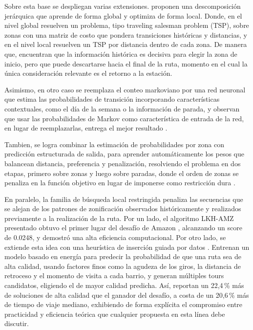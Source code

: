 Sobre esta base se despliegan varias extensiones.  proponen una descomposición jerárquica que aprende de forma global y optimiza de forma local. Donde, en el nivel global resuelven un problema, tipo traveling salesman problem (TSP), sobre zonas con una matriz de costo que pondera transiciones históricas y distancias, y en el nivel local resuelven un TSP por distancia dentro de cada zona. De manera que, encuentran que la información histórica es decisiva para elegir la zona de inicio, pero que puede descartarse hacia el final de la ruta, momento en el cual la única consideración relevante es el retorno a la estación.

Asimismo, en otro caso se reemplaza el conteo markoviano por una red neuronal que estima las probabilidades de transición incorporando características contextuales, como el día de la semana o la información de parada, y observan que usar las probabilidades de Markov como característica de entrada de la red, en lugar de reemplazarlas, entrega el mejor resultado \cite{mandi2021datadriven}.

Tambien, se logra combinar la estimación de probabilidades por zona con predicción estructurada de salida, para aprender automáticamente los pesos que balancean distancia, preferencia y penalización, resolviendo el problema en dos etapas, primero sobre zonas y luego sobre paradas, donde el orden de zonas se penaliza en la función objetivo en lugar de imponerse como restricción dura \cite{canoy2024probability}.

En paralelo,  la familia de búsqueda local restringida penaliza las secuencias que se alejan de los patrones de zonificación observados históricamente y realizados previamente a la realización de la ruta. Por un lado, el algoritmo LKH-AMZ presentado obtuvo el primer lugar del desafío de Amazon \cite{cook2024constrained}, alcanzando un score de 0.0248, y demostró una alta eficiencia computacional. Por otro lado, se extiende esta idea con una heurística de inserción guiada por datos \cite{rashidi2025generating}. Entrenan un modelo basado en energía para predecir la probabilidad de que una ruta sea de alta calidad, usando factores finos como la agudeza de los giros, la distancia de retroceso y el momento de visita a cada barrio, y generan múltiples tours candidatos, eligiendo el de mayor calidad predicha. Así, reportan un 22,4\,\% más de soluciones de alta calidad que el ganador del desafío, a costa de un 20,6\,\% más de tiempo de viaje mediano, exhibiendo de forma explícita el compromiso entre practicidad y eficiencia teórica que cualquier propuesta en esta línea debe discutir.


